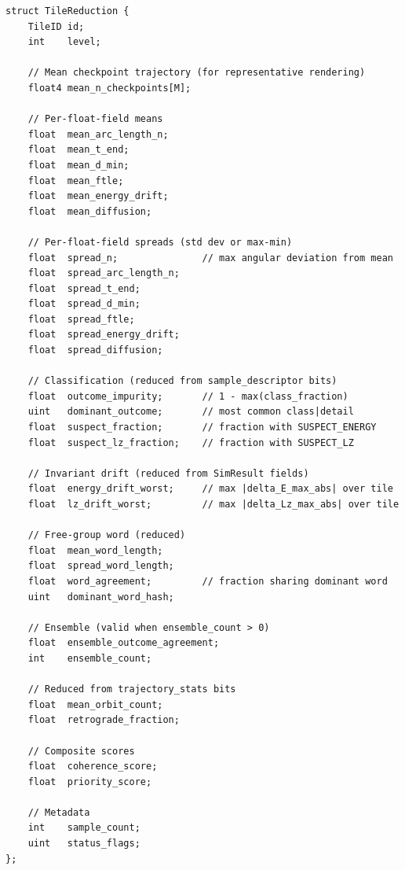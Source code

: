 \documentclass[11pt]{report}
\begin{document}
\begin{verbatim}
struct TileReduction {
    TileID id;
    int    level;

    // Mean checkpoint trajectory (for representative rendering)
    float4 mean_n_checkpoints[M];

    // Per-float-field means
    float  mean_arc_length_n;
    float  mean_t_end;
    float  mean_d_min;
    float  mean_ftle;
    float  mean_energy_drift;
    float  mean_diffusion;

    // Per-float-field spreads (std dev or max-min)
    float  spread_n;               // max angular deviation from mean
    float  spread_arc_length_n;
    float  spread_t_end;
    float  spread_d_min;
    float  spread_ftle;
    float  spread_energy_drift;
    float  spread_diffusion;

    // Classification (reduced from sample_descriptor bits)
    float  outcome_impurity;       // 1 - max(class_fraction)
    uint   dominant_outcome;       // most common class|detail
    float  suspect_fraction;       // fraction with SUSPECT_ENERGY
    float  suspect_lz_fraction;    // fraction with SUSPECT_LZ

    // Invariant drift (reduced from SimResult fields)
    float  energy_drift_worst;     // max |delta_E_max_abs| over tile
    float  lz_drift_worst;         // max |delta_Lz_max_abs| over tile

    // Free-group word (reduced)
    float  mean_word_length;
    float  spread_word_length;
    float  word_agreement;         // fraction sharing dominant word
    uint   dominant_word_hash;

    // Ensemble (valid when ensemble_count > 0)
    float  ensemble_outcome_agreement;
    int    ensemble_count;

    // Reduced from trajectory_stats bits
    float  mean_orbit_count;
    float  retrograde_fraction;

    // Composite scores
    float  coherence_score;
    float  priority_score;

    // Metadata
    int    sample_count;
    uint   status_flags;
};
\end{verbatim}
\end{document}
